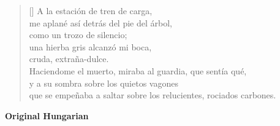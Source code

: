 \documentclass[a4paper,12pt,twoside,final]{book}
\begin{document}

\settowidth{\versewidth}{que se empeñaba a saltar sobre los relucientes, rociados carbones.}

\begin{verse}[\versewidth]
  A la estación de tren de carga, \\
  me aplané así detrás del pie del árbol, \\
  como un trozo de silencio; \\
  una hierba gris alcanzó mi boca, \\
  cruda, extraña-dulce. \\
  Haciendome el muerto, miraba al guardia, que sentía qué, \\
  y a su sombra sobre los quietos vagones \\
  que se empeñaba a saltar sobre los relucientes, rociados carbones. \\
\end{verse}

\newpage


\noindent \textbf{Original Hungarian}



\settowidth{\versewidth}{Csak ami nincs, annak van bokra,}
\end{document}
